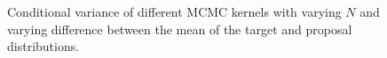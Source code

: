 \begin{figure}[H]
  \centering
  \caption{Conditional variance of different MCMC kernels with varying \(N\) and varying difference between the mean of the target and proposal distributions.
  }\label{fig:simulations}
  \vspace{-0.1in}
\end{figure}

